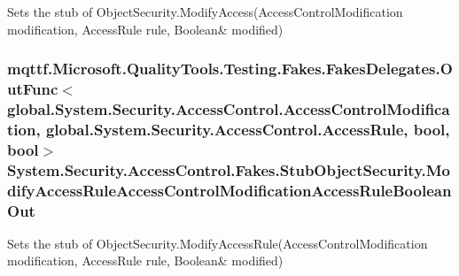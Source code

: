 Sets the stub of Object\-Security.\-Modify\-Access(Access\-Control\-Modification modification, Access\-Rule rule, Boolean\& modified)

\hypertarget{class_system_1_1_security_1_1_access_control_1_1_fakes_1_1_stub_object_security_a81826f0685be009a8dfa1c48cef46e6e}{
\subsubsection[{Modify\-Access\-Rule\-Access\-Control\-Modification\-Access\-Rule\-Boolean\-Out}]{\setlength{\rightskip}{0pt plus 5cm}mqttf.\-Microsoft.\-Quality\-Tools.\-Testing.\-Fakes.\-Fakes\-Delegates.\-Out\-Func$<$global.\-System.\-Security.\-Access\-Control.\-Access\-Control\-Modification, global.\-System.\-Security.\-Access\-Control.\-Access\-Rule, bool, bool$>$ System.\-Security.\-Access\-Control.\-Fakes.\-Stub\-Object\-Security.\-Modify\-Access\-Rule\-Access\-Control\-Modification\-Access\-Rule\-Boolean\-Out}}\label{class_system_1_1_security_1_1_access_control_1_1_fakes_1_1_stub_object_security_a81826f0685be009a8dfa1c48cef46e6e}


Sets the stub of Object\-Security.\-Modify\-Access\-Rule(Access\-Control\-Modification modification, Access\-Rule rule, Boolean\& modified)


